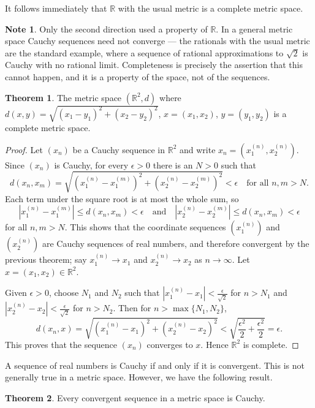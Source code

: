 \documentclass[11pt,a4paper]{article}
\theoremstyle{definition}
\newtheorem{thm}{Theorem}[subsection]
\newtheorem*{note}{Note}
\begin{document}
It follows immediately that $\mathbb{R}$ with the usual metric is a complete
metric space.

\begin{note}
Only the second direction used a property of $\mathbb{R}$. In a general metric
space Cauchy sequences need not converge --- the rationals with the usual metric
are the standard example, where a sequence of rational approximations to
$\sqrt2$ is Cauchy with no rational limit. Completeness is precisely the
assertion that this cannot happen, and it is a property of the space, not of the
sequences.
\end{note}

\begin{thm}
The metric space $(\mathbb{R}^2,d)$ where $d(x,y)=\sqrt{(x_1-y_1)^2+(x_2-y_2)^2}$, $x=(x_1,x_2)$, $y=(y_1,y_2)$ is a complete metric space.
\end{thm}

\begin{proof}
Let $(x_n)$ be a Cauchy sequence in $\mathbb{R}^2$ and write $x_n=(x_1^{(n)},x_2^{(n)})$. Since $(x_n)$ is Cauchy, for every $\epsilon >0$ there is an $N>0$ such that
$$d(x_n,x_m)=\sqrt{(x_1^{(n)}-x_1^{(m)})^2+(x_2^{(n)}-x_2^{(m)})^2}<\epsilon \quad\text{for all } n,m>N.$$
Each term under the square root is at most the whole sum, so
$$|x_1^{(n)}-x_1^{(m)}|\leq d(x_n,x_m)<\epsilon \quad\text{and}\quad |x_2^{(n)}-x_2^{(m)}|\leq d(x_n,x_m)<\epsilon$$
for all $n,m>N$. This shows that the coordinate sequences $(x_1^{(n)})$ and $(x_2^{(n)})$ are Cauchy sequences of real numbers, and therefore convergent by the previous theorem; say $x_1^{(n)}\rightarrow x_1$ and $x_2^{(n)}\rightarrow x_2$ as $n\rightarrow \infty$. Let $x=(x_1,x_2)\in \mathbb{R}^2$.

Given $\epsilon>0$, choose $N_1$ and $N_2$ such that $|x_1^{(n)}-x_1|<\frac{\epsilon}{\sqrt2}$ for $n>N_1$ and $|x_2^{(n)}-x_2|<\frac{\epsilon}{\sqrt2}$ for $n>N_2$. Then for $n>\max\{N_1,N_2\}$,
$$d(x_n,x)=\sqrt{(x_1^{(n)}-x_1)^2+(x_2^{(n)}-x_2)^2}<\sqrt{\frac{\epsilon^2}{2}+\frac{\epsilon^2}{2}}=\epsilon.$$
This proves that the sequence $(x_n)$ converges to $x$. Hence $\mathbb{R}^2$ is complete.
\end{proof}

A sequence of real numbers is Cauchy if and only if it is convergent. This is not generally true in a metric space. However, we have the following result.

\begin{thm}
Every convergent sequence in a metric space is Cauchy.
\end{thm}
\end{document}
